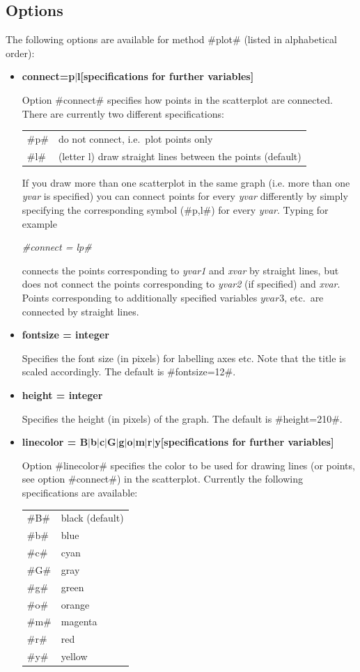 \subsection*{Options}

The following options are available for method #plot# (listed in
alphabetical order):

\begin{itemize}
\item {\bf connect=p$|$l[specifications for further variables]}

Option #connect# specifies how points in the scatterplot are
connected. There are currently two different specifications:

\begin{tabular}{ll}
#p# & do not connect, i.e.~plot points only \\
#l# & (letter l) draw straight lines between the points (default) \\
\end{tabular}

If you draw more than one scatterplot in the same graph (i.e. more
than one {\em yvar} is specified) you can connect points for every
{\em yvar} differently by simply specifying the corresponding
symbol (#p,l#) for every {\em yvar}. Typing for example

{\em #connect = lp#}

connects the points corresponding to {\em yvar1} and {\em xvar} by
straight lines, but does not connect the points corresponding to
{\em yvar2} (if specified) and {\em xvar}. Points corresponding to
additionally specified variables $yvar3$, etc.~are connected by
straight lines.
\item {\bf fontsize = integer}

Specifies the font size (in pixels) for labelling axes etc. Note
that the title is scaled accordingly. The default is
#fontsize=12#.
\item {\bf height = integer}

Specifies the height (in pixels) of the graph. The default is
#height=210#.
\item {\bf linecolor = B$|$b$|$c$|$G$|$g$|$o$|$m$|$r$|$y[specifications for further variables]}

Option #linecolor# specifies the color to be used for drawing
lines (or points, see option #connect#) in the scatterplot.
Currently the following specifications are available:

\begin{tabular}{ll}
#B# & black (default) \\
#b# & blue \\
#c# & cyan \\
#G# & gray \\
#g# & green \\
#o# & orange \\
#m# & magenta \\
#r# & red \\
#y# & yellow \\
\end{tabular}


\end{itemize}
